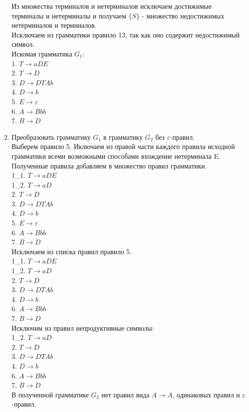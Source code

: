 \documentclass[a4paper,14pt]{extarticle}
\begin{document}
\begin{enumerate}[1.]
Из множества терминалов и нетерминалов исключаем достижимые 
терминалы и нетерминалы и получаем $\{S\}$ - множество недостижимых нетерминалов и терминалов.\\

Исключаем из грамматики правило 13, так как оно содержит недостижимый символ.\\
Искомая грамматика $G_1$:\\
1. $T \rightarrow aDE$\\
2. $T \rightarrow D$\\
3. $D \rightarrow DTAb$\\
4. $D \rightarrow b$\\
5. $E \rightarrow \varepsilon$\\
6. $A \rightarrow Bbb$\\
7. $B \rightarrow D$\\

\item Преобразовать грамматику $G_1$ в грамматику $G_2$ без $\varepsilon$-правил.\\
Выберем правило 5. Иключаем из правой части каждого правила исходной грамматики
всеми возможными способами вхождение нетерминала E. Полученные правила добавляем в множество 
правил грамматики.\\
1\_1. $T \rightarrow aDE$\\
1\_2. $T \rightarrow aD$\\
2. $T \rightarrow D$\\
3. $D \rightarrow DTAb$\\
4. $D \rightarrow b$\\
5. $E \rightarrow \varepsilon$\\
6. $A \rightarrow Bbb$\\
7. $B \rightarrow D$\\
Исключаем из списка правил правило 5.\\
1\_1. $T \rightarrow aDE$\\
1\_2. $T \rightarrow aD$\\
2. $T \rightarrow D$\\
3. $D \rightarrow DTAb$\\
4. $D \rightarrow b$\\
6. $A \rightarrow Bbb$\\
7. $B \rightarrow D$\\
Исключим из правил непродуктивные символы:\\
1\_2. $T \rightarrow aD$\\
2. $T \rightarrow D$\\
3. $D \rightarrow DTAb$\\
4. $D \rightarrow b$\\
6. $A \rightarrow Bbb$\\
7. $B \rightarrow D$\\
В полученной грамматике $G_2$ нет правил вида $A \rightarrow A$, одинаковых правил и $\varepsilon$-правил.


\end{enumerate}
\end{document}
